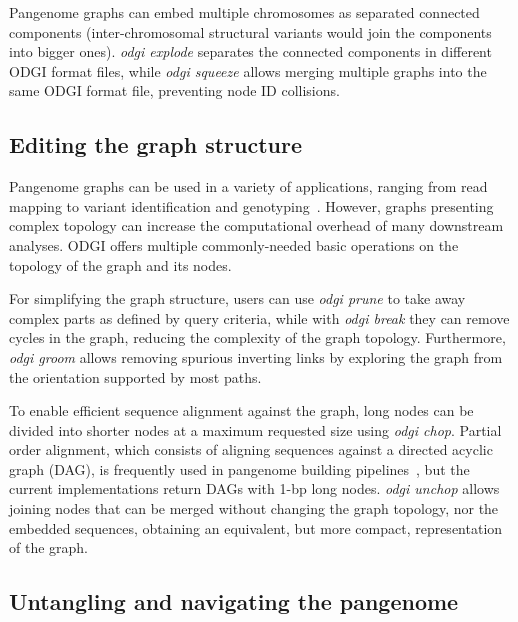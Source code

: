 \documentclass{bioinfo}
\begin{document}
Pangenome graphs can embed multiple chromosomes as separated connected components (inter-chromosomal structural variants would join the components into bigger ones).
\textit{odgi explode} separates the connected components in different ODGI format files, while \textit{odgi squeeze} allows merging multiple graphs into the same ODGI format file, preventing node ID collisions.


\subsection{Editing the graph structure}
\label{sec:edit}

Pangenome graphs can be used in a variety of applications, ranging from read mapping to variant identification and genotyping~\citep{Eizenga_2020}.
However, graphs presenting complex topology can increase the computational overhead of many downstream analyses.
ODGI offers multiple commonly-needed basic operations on the topology of the graph and its nodes.

For simplifying the graph structure, users can use \textit{odgi prune} to take away complex parts as defined by query criteria,
while with \textit{odgi break} they can remove cycles in the graph, reducing the complexity of the graph topology.
Furthermore, \textit{odgi groom} allows removing spurious inverting links by exploring the graph from the orientation supported by most paths.

To enable efficient sequence alignment against the graph, long nodes can be divided into shorter nodes at a maximum requested size using \textit{odgi chop}.
Partial order alignment, which consists of aligning sequences against a directed acyclic graph (DAG), is frequently used in pangenome building pipelines~\citep{pggb}, but the current implementations return DAGs with 1-bp long nodes.
\textit{odgi unchop} allows joining nodes that can be merged without changing the graph topology, nor the embedded sequences, obtaining an equivalent, but more compact, representation of the graph.


\subsection{Untangling and navigating the pangenome}
\label{sec:untangle}

\end{document}
